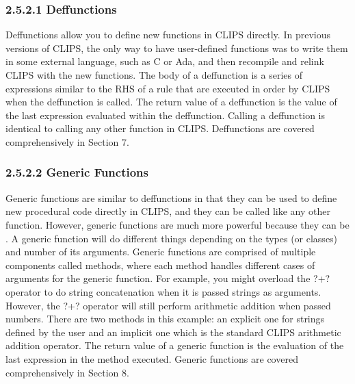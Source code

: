\documentclass[letterpaper,10pt,english]{sphinxmanual}
\begin{document}
\subsubsection{2.5.2.1 Deffunctions}
\label{\detokenize{overview:deffunctions}}
Deffunctions allow you to define new functions in CLIPS directly. In
previous versions of CLIPS, the only way to have user-defined functions
was to write them in some external language, such as C or Ada, and then
recompile and relink CLIPS with the new functions. The body of a
deffunction is a series of expressions similar to the RHS of a rule that
are executed in order by CLIPS when the deffunction is called. The
return value of a deffunction is the value of the last expression
evaluated within the deffunction. Calling a deffunction is identical to
calling any other function in CLIPS. Deffunctions are covered
comprehensively in Section 7.


\subsubsection{2.5.2.2 Generic Functions}
\label{\detokenize{overview:generic-functions}}
Generic functions are similar to deffunctions in that they can be used
to define new procedural code directly in CLIPS, and they can be called
like any other function. However, generic functions are much more
powerful because they can be . A generic function will do
different things depending on the types (or classes) and number of its
arguments. Generic functions are comprised of multiple components called
methods, where each method handles different cases of arguments for the
generic function. For example, you might overload the ?+? operator to do
string concatenation when it is passed strings as arguments. However,
the ?+? operator will still perform arithmetic addition when passed
numbers. There are two methods in this example: an explicit one for
strings defined by the user and an implicit one which is the standard
CLIPS arithmetic addition operator. The return value of a generic
function is the evaluation of the last expression in the method
executed. Generic functions are covered comprehensively in Section 8.
\end{document}
